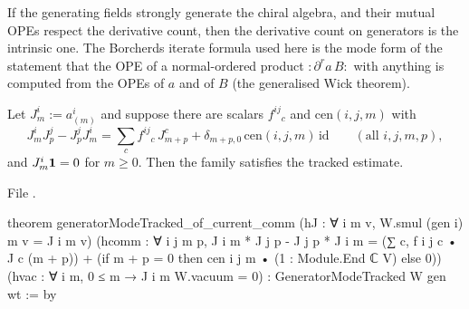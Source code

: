 \begin{physics}
If the generating fields strongly generate the chiral algebra, and their mutual OPEs respect the derivative count, then
the derivative count on generators is the intrinsic one. The Borcherds iterate formula used here is the mode form of
the statement that the OPE of a normal-ordered product ${:}\partial^ra\,B{:}$ with anything is computed from the OPEs of
$a$ and of $B$ (the generalised Wick theorem).
\end{physics}

\begin{theorem}\label{l11:thm:liecurrents}
Let $J^i_m := a^i_{(m)}$ and suppose there are scalars $f^{ij}{}_c$ and $\mathrm{cen}(i,j,m)$ with
\begin{equation*}
  J^i_mJ^j_p - J^j_pJ^i_m = \sum_cf^{ij}{}_c\,J^c_{m+p} + \delta_{m+p,0}\,\mathrm{cen}(i,j,m)\,\mathrm{id}\qquad(\text{all }i,j,m,p),
\end{equation*}
and $J^i_m\mathbf{1} = 0$ for $m\ge0$. Then the family satisfies the tracked estimate.
\end{theorem}
\noindent File .
\begin{leancode}
theorem generatorModeTracked_of_current_comm (hJ : ∀ i m v, W.smul (gen i) m v = J i m v)
    (hcomm : ∀ i j m p, J i m * J j p - J j p * J i m =
      (∑ c, f i j c • J c (m + p)) +
        (if m + p = 0 then cen i j m • (1 : Module.End ℂ V) else 0))
    (hvac : ∀ i m, 0 ≤ m → J i m W.vacuum = 0) :
    GeneratorModeTracked W gen wt := by
\end{leancode}

